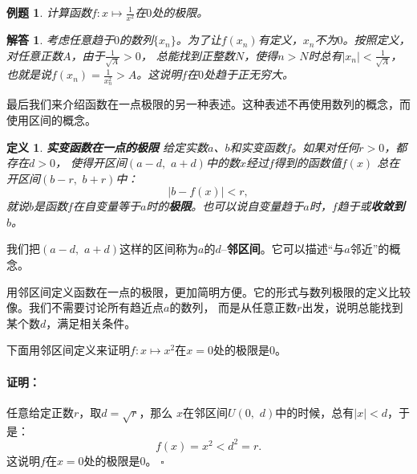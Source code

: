 \documentclass[12pt,UTF8]{ctexbook}
\newtheorem{df}{定义}[section]
\newtheorem{et}{例题}[section]
\newtheorem*{so}{解答}
\renewenvironment{proof}{\paragraph{\textbf{证明：}}}{\hfill$\square$}
\begin{document}
\begin{et}
    计算函数$f: x\mapsto \frac{1}{x^2}$在$0$处的极限。
\end{et}
\begin{so}
    考虑任意趋于$0$的数列$\{x_n\}$。为了让$f(x_n)$有定义，$x_n$不为$0$。按照定义，对任意正数$A$，由于$\frac{1}{\sqrt{A}} > 0$，
    总能找到正整数$N$，使得$n>N$时总有$|x_n| < \frac{1}{\sqrt{A}}$，也就是说$f(x_n) = \frac{1}{x_n^2} > A$。这说明$f$在$0$处趋于正无穷大。
\end{so}

最后我们来介绍函数在一点极限的另一种表述。这种表述不再使用数列的概念，而使用区间的概念。

\begin{df}\textbf{实变函数在一点的极限}
    给定实数$a$、$b$和实变函数$f$。如果对任何$r>0$，都存在$d>0$，
    使得开区间$(a-d,\,\,a+d)$中的数$x$经过$f$得到的函数值$f(x)$
    总在开区间$(b-r,\,\,b+r)$中\footnotemark：
    $$ |b - f(x)| < r,$$
    就说$b$是函数$f$在自变量等于$a$时的\textbf{极限}。也可以说自变量趋于$a$时，$f$趋于或\textbf{收敛到} $b$。
\end{df}

我们把$(a-d,\,\,a+d)$这样的区间称为$a$的$d$–\textbf{邻区间}。它可以描述“与$a$邻近”的概念。

用邻区间定义函数在一点的极限，更加简明方便。它的形式与数列极限的定义比较像。我们不需要讨论所有趋近点$a$的数列，
而是从任意正数$r$出发，说明总能找到某个数$d$，满足相关条件。

下面用邻区间定义来证明$f:x\mapsto x^2$在$x=0$处的极限是$0$。
\begin{proof}
    任意给定正数$r$，取$d = \sqrt{r}$，那么
    $x$在邻区间$U(0,\,\, d)$中的时候，总有$|x| < d$，于是：
    $$f(x) = x^2 < d^2 = r.$$
    这说明$f$在$x=0$处的极限是$0$。
\end{proof}
\end{document}
